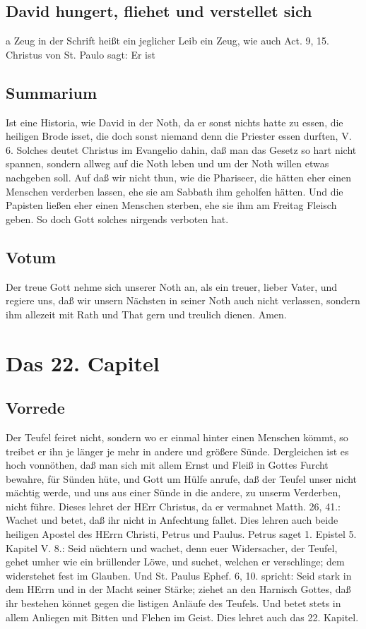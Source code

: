\section{David hungert, fliehet und verstellet sich}

a Zeug in der Schrift heißt ein jeglicher Leib ein Zeug, wie auch Act. 9, 15. Christus von St. Paulo sagt: Er ist

\section{Summarium}

Ist eine Historia, wie David in der Noth, da er sonst nichts hatte zu essen, die heiligen Brode isset, die doch sonst niemand denn die Priester essen durften, V. 6. Solches deutet Christus im Evangelio dahin, daß man das Gesetz so hart nicht spannen, sondern allweg auf die Noth leben und um der Noth willen etwas nachgeben soll. Auf daß wir nicht thun, wie die Phariseer, die hätten eher einen Menschen verderben lassen, ehe sie am Sabbath ihm geholfen hätten. Und die Papisten ließen eher einen Menschen sterben, ehe sie ihm am Freitag Fleisch geben. So doch Gott solches nirgends verboten hat.

\section{Votum}

Der treue Gott nehme sich unserer Noth an, als ein treuer, lieber Vater, und regiere uns, daß wir unsern Nächsten in seiner Noth auch nicht verlassen, sondern ihm allezeit mit Rath und That gern und treulich dienen. Amen.

\chapter{Das 22. Capitel}

\section{Vorrede}

Der Teufel feiret nicht, sondern wo er einmal hinter einen Menschen kömmt, so treibet er ihn je länger je mehr in andere und größere Sünde. Dergleichen ist es hoch vonnöthen, daß man sich mit allem Ernst und Fleiß in Gottes Furcht bewahre, für Sünden hüte, und Gott um Hülfe anrufe, daß der Teufel unser nicht mächtig werde, und uns aus einer Sünde in die andere, zu unserm Verderben, nicht führe. Dieses lehret der HErr Christus, da er vermahnet Matth. 26, 41.: Wachet und betet, daß ihr nicht in Anfechtung fallet. Dies lehren auch beide heiligen Apostel des HErrn Christi, Petrus und Paulus. Petrus saget 1. Epistel 5. Kapitel V. 8.: Seid nüchtern und wachet, denn euer Widersacher, der Teufel, gehet umher wie ein brüllender Löwe, und suchet, welchen er verschlinge; dem widerstehet fest im Glauben. Und St. Paulus Ephef. 6, 10. spricht: Seid stark in dem HErrn und in der Macht seiner Stärke; ziehet an den Harnisch Gottes, daß ihr bestehen könnet gegen die listigen Anläufe des Teufels. Und betet stets in allem Anliegen mit Bitten und Flehen im Geist. Dies lehret auch das 22. Kapitel.

